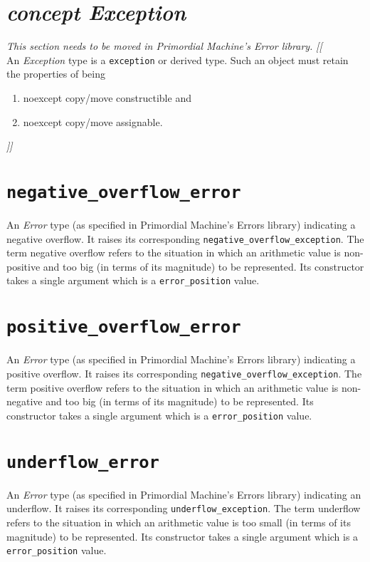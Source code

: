 \documentclass[oneside]{book}
\begin{document}
\section{\textit{concept Exception}}
\textit{\color{orange}This section needs to be moved in Primordial Machine's Error library.}
\noindent\textit{\color{orange}[[}\\
An \textit{Exception} type is a \texttt{exception} or derived type.
Such an object must retain the properties of being
\begin{enumerate}
  \item noexcept copy/move constructible and
  \item noexcept copy/move assignable.
\end{enumerate}
\noindent\textit{\color{orange}]]}

\section{\texttt{negative\_overflow\_error}}
An \textit{Error} type (as specified in Primordial Machine's Errors library) indicating a negative overflow.
It raises its corresponding \texttt{negative\_overflow\_exception}.
The term negative overflow refers to the situation in which an arithmetic value is non-positive and
too big (in terms of its magnitude) to be represented. Its constructor takes a single argument which
is a \texttt{error\_position} value.

\section{\texttt{positive\_overflow\_error}}
An \textit{Error} type (as specified in Primordial Machine's Errors library) indicating a positive overflow.
It raises its corresponding \texttt{negative\_overflow\_exception}.
The term positive overflow refers to the situation in which an arithmetic value is non-negative and
too big (in terms of its magnitude) to be represented. Its constructor takes a single argument which
is a \texttt{error\_position} value.

\section{\texttt{underflow\_error}}
An \textit{Error} type (as specified in Primordial Machine's Errors library) indicating an underflow.
It raises its corresponding \texttt{underflow\_exception}.
The term underflow refers to the situation in which an arithmetic value is too small (in terms of
its magnitude) to be represented. Its constructor takes a single argument which
is a \texttt{error\_position} value.
\end{document}
